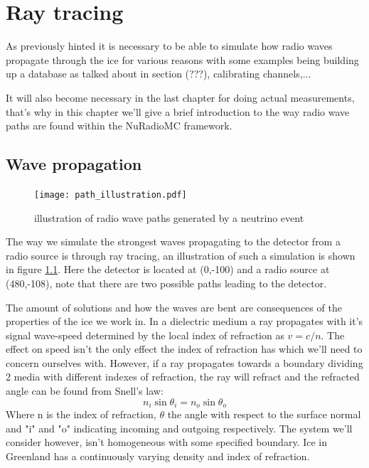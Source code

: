 \chapter{Ray tracing}
\label{chap:RT}
As previously hinted it is necessary to be able to simulate how radio waves
propagate through the ice for various reasons with some examples being
building up a database as talked about in section (???), calibrating channels,...

It will also become necessary in the last chapter for doing actual measurements,
that's why in this chapter we'll give a brief introduction to the way radio wave
paths are found within the NuRadioMC framework.
\section{Wave propagation}
\begin{figure}[h!]
	\centering
	\texttt{[image: path\_illustration.pdf]}
	\label{fig:PathIllu}
	\caption{illustration of radio wave paths generated by a neutrino event}
\end{figure}
The way we simulate the strongest waves propagating to the detector from a
radio source is through ray tracing, an illustration of such a simulation is
shown in figure \ref{fig:PathIllu}.  Here the detector is located at (0,-100)
and a radio source at (480,-108), note that there are two possible paths
leading to the detector.

The amount of solutions and how the waves are bent are consequences of the
properties of the ice we work in.  In a dielectric medium a ray propagates with
it's signal wave-speed determined by the local index of refraction as $v =
c/n$.   The effect on speed isn't the only effect the index of refraction has
which we'll need to concern ourselves with. However, if a ray propagates towards
a boundary dividing 2 media with different indexes of refraction, the ray will
refract and the refracted angle can be found from Snell's law:
\begin{equation}
	n_i\sin{\theta_i} = n_o\sin{\theta_o}
\end{equation}
Where n is the index of refraction, $\theta$ the angle with respect to the
surface normal and "i" and "o" indicating incoming and outgoing respectively.
The system we'll consider however, isn't homogeneous with some specified
boundary. Ice in Greenland has a continuously varying density and
index of refraction.

